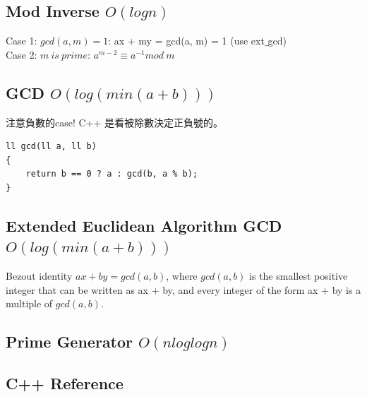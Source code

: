 \documentclass[10pt,oneside]{article}
\begin{document}
\begin{landscape}
\begin{multicols}{2}
\subsection{Mod Inverse $ O(log n) $}

Case 1: $gcd(a, m) = 1$:  ax + my = gcd(a, m) = 1 (use ext$\_$gcd) \\

\noindent Case 2: $m\ is\ prime$: $a^{m - 2} \equiv a^{-1} mod\ m$ 

\subsection{GCD $O(log( min(a + b) ))$}

注意負數的case! C++ 是看被除數決定正負號的。

\begin{verbatim}
ll gcd(ll a, ll b)
{
    return b == 0 ? a : gcd(b, a % b);
}
\end{verbatim}

\subsection{Extended Euclidean Algorithm GCD $O(log( min(a + b) ))$}

Bezout identity $ax + by = gcd(a, b)$, where $gcd(a, b)$ is the smallest positive integer that can be written as ax + by, and every integer of the form ax + by is a multiple of $gcd(a, b)$.


\subsection{Prime Generator $ O(n loglogn) $}

\subsection{C++ Reference}





\end{multicols}
\end{landscape}
\end{document}
